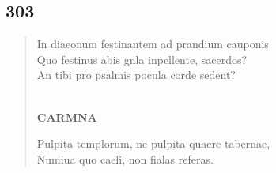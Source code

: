 \documentclass[11pt, a4paper]{report}
\begin{document}
            \subsection*{303}
      \begin{verse}
      In diaeonum festinantem ad prandium cauponis \\ Quo festinus abis gnla inpellente, sacerdos? \\ An tibi pro psalmis pocula corde sedent? \\ 
        ﻿\pagebreak 
    \begin{center} \textbf{CARMNA} \end{center} \marginpar{[256]} Pulpita templorum, ne pulpita quaere tabernae, \\ Numiua quo caeli, non fialas referas. \\ 
      \end{verse}
  
\end{document}
